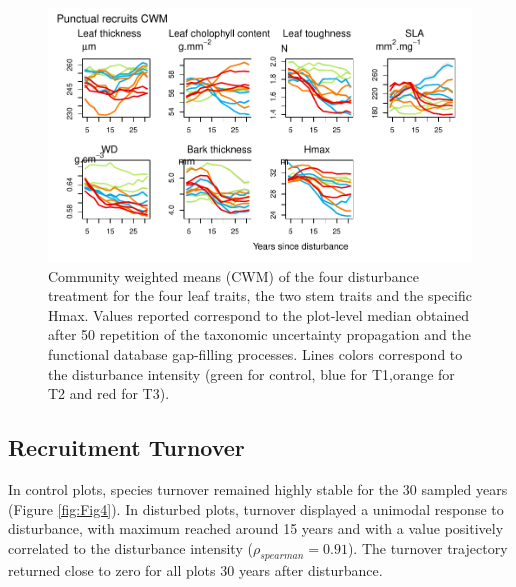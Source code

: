 \documentclass[fleqn,10pt]{ArtEcoFoG} %
\begin{document}
\begin{figure}

{\centering \includegraphics[width=0.8\linewidth]{RecruitmentTrajectories_files/figure-latex/Fig3-1} 

}

\caption{Community weighted means (CWM) of the four disturbance treatment for the four leaf traits, the two stem traits  and the specific Hmax. Values reported correspond to the plot-level median obtained after 50 repetition of the taxonomic uncertainty propagation and the functional database gap-filling processes. Lines colors correspond to the disturbance intensity (green for control, blue for T1,orange for T2 and red for T3).}\label{fig:Fig3}
\end{figure}

\subsection{Recruitment Turnover}\label{recruitment-turnover}

In control plots, species turnover remained highly stable for the 30
sampled years (Figure \ref{fig:Fig4}). In disturbed plots, turnover
displayed a unimodal response to disturbance, with maximum reached
around 15 years and with a value positively correlated to the
disturbance intensity (\(\rho_{spearman}=0.91\)). The turnover
trajectory returned close to zero for all plots 30 years after
disturbance.
\end{document}
